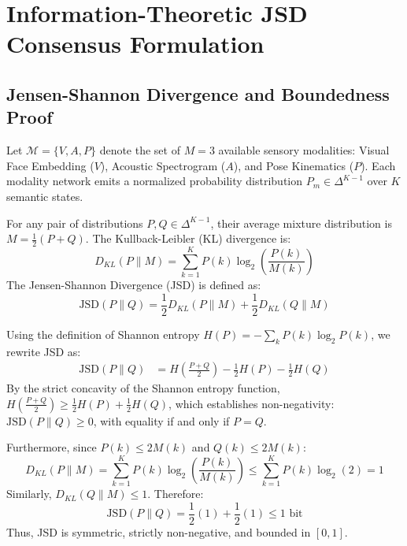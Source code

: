 \documentclass[10pt,journal,compsoc]{IEEEtran}
\begin{document}
\section{Information-Theoretic JSD Consensus Formulation}

\subsection{Jensen-Shannon Divergence and Boundedness Proof}
Let $\mathcal{M} = \{V, A, P\}$ denote the set of $M=3$ available sensory modalities: Visual Face Embedding ($V$), Acoustic Spectrogram ($A$), and Pose Kinematics ($P$). Each modality network emits a normalized probability distribution $P_m \in \Delta^{K-1}$ over $K$ semantic states.

For any pair of distributions $P, Q \in \Delta^{K-1}$, their average mixture distribution is $M = \frac{1}{2}(P + Q)$. The Kullback-Leibler (KL) divergence is:
\begin{equation}
D_{KL}(P \parallel M) = \sum_{k=1}^K P(k) \log_2 \left( \frac{P(k)}{M(k)} \right)
\end{equation}
The Jensen-Shannon Divergence (JSD) is defined as:
\begin{equation}
\text{JSD}(P \parallel Q) = \frac{1}{2} D_{KL}(P \parallel M) + \frac{1}{2} D_{KL}(Q \parallel M)
\end{equation}

\begin{IEEEproof}
Using the definition of Shannon entropy $H(P) = -\sum_{k} P(k) \log_2 P(k)$, we rewrite JSD as:
\begin{align}
\text{JSD}(P \parallel Q) &= H\left(\frac{P + Q}{2}\right) - \frac{1}{2} H(P) - \frac{1}{2} H(Q)
\end{align}
By the strict concavity of the Shannon entropy function, $H(\frac{P+Q}{2}) \ge \frac{1}{2} H(P) + \frac{1}{2} H(Q)$, which establishes non-negativity: $\text{JSD}(P \parallel Q) \ge 0$, with equality if and only if $P = Q$.

Furthermore, since $P(k) \le 2 M(k)$ and $Q(k) \le 2 M(k)$:
\begin{equation}
D_{KL}(P \parallel M) = \sum_{k=1}^K P(k) \log_2 \left( \frac{P(k)}{M(k)} \right) \le \sum_{k=1}^K P(k) \log_2(2) = 1
\end{equation}
Similarly, $D_{KL}(Q \parallel M) \le 1$. Therefore:
\begin{equation}
\text{JSD}(P \parallel Q) = \frac{1}{2}(1) + \frac{1}{2}(1) \le 1\text{ bit}
\end{equation}
Thus, JSD is symmetric, strictly non-negative, and bounded in $[0, 1]$.
\end{IEEEproof}
\end{document}
